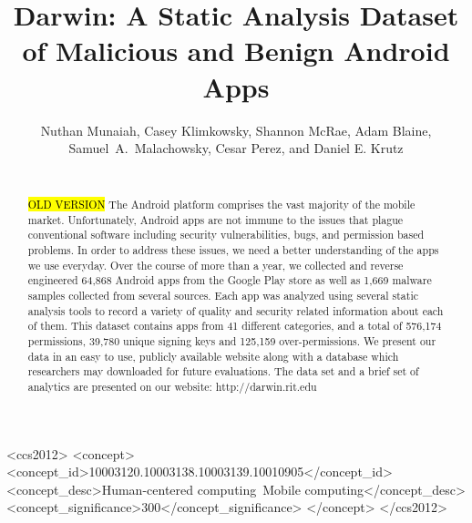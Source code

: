 \documentclass{sig-alternate-05-2015}
\begin{document}
\toappear{}

\title{Darwin: A Static Analysis Dataset of Malicious and Benign Android Apps}


\author{
\alignauthor
Nuthan Munaiah, Casey Klimkowsky, Shannon McRae, Adam Blaine,  Samuel~A.~Malachowsky, Cesar Perez, and Daniel E. Krutz \\
       \\
       \alignauthor
} %

\maketitle 
\begin{abstract} %
\hl{OLD VERSION} 
The Android platform comprises the vast majority of the mobile market. Unfortunately, Android apps are not immune to the issues that plague conventional software including security vulnerabilities, bugs, and permission based problems. In order to address these issues, we need a better understanding of the apps we use everyday. Over the course of more than a year, we collected and reverse engineered 64,868 Android apps from the Google Play store as well as 1,669 malware samples collected from several sources. Each app was analyzed using several static analysis tools to record a variety of quality and security related information about each of them. This dataset contains apps from 41 different categories, and a total of 576,174 permissions, 39,780 unique signing keys and 125,159 over-permissions. We present our data in an easy to use, publicly available website along with a database which researchers may downloaded for future evaluations. The data set and a brief set of analytics are presented on our website: http://darwin.rit.edu

\end{abstract}


\begin{CCSXML}
<ccs2012>
<concept>
<concept_id>10003120.10003138.10003139.10010905</concept_id>
<concept_desc>Human-centered computing~Mobile computing</concept_desc>
<concept_significance>300</concept_significance>
</concept>
</ccs2012>
\end{CCSXML}

\printccsdesc

\end{document}
